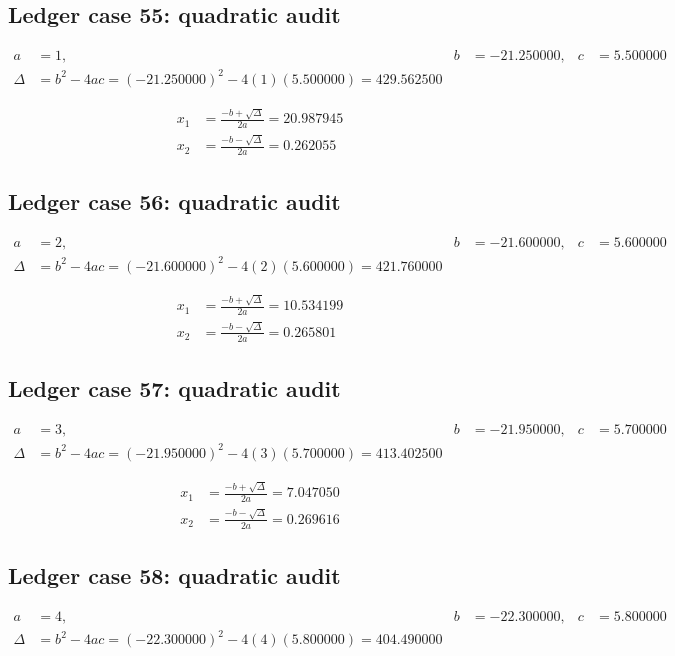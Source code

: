 \documentclass[11pt,a4paper]{article}
\begin{document}
\newpage

\subsection{Ledger case 55: quadratic audit}
\begin{align}
a &= 1, & b &= -21.250000, & c &= 5.500000 \\
\Delta &= b^2-4ac = (-21.250000)^2 - 4(1)(5.500000) = 429.562500
\end{align}

\begin{align}
x_1 &= \frac{-b+\sqrt{\Delta}}{2a} = 20.987945 \\
x_2 &= \frac{-b-\sqrt{\Delta}}{2a} = 0.262055
\end{align}

\subsection{Ledger case 56: quadratic audit}
\begin{align}
a &= 2, & b &= -21.600000, & c &= 5.600000 \\
\Delta &= b^2-4ac = (-21.600000)^2 - 4(2)(5.600000) = 421.760000
\end{align}

\begin{align}
x_1 &= \frac{-b+\sqrt{\Delta}}{2a} = 10.534199 \\
x_2 &= \frac{-b-\sqrt{\Delta}}{2a} = 0.265801
\end{align}

\subsection{Ledger case 57: quadratic audit}
\begin{align}
a &= 3, & b &= -21.950000, & c &= 5.700000 \\
\Delta &= b^2-4ac = (-21.950000)^2 - 4(3)(5.700000) = 413.402500
\end{align}

\begin{align}
x_1 &= \frac{-b+\sqrt{\Delta}}{2a} = 7.047050 \\
x_2 &= \frac{-b-\sqrt{\Delta}}{2a} = 0.269616
\end{align}

\newpage

\subsection{Ledger case 58: quadratic audit}
\begin{align}
a &= 4, & b &= -22.300000, & c &= 5.800000 \\
\Delta &= b^2-4ac = (-22.300000)^2 - 4(4)(5.800000) = 404.490000
\end{align}
\end{document}
